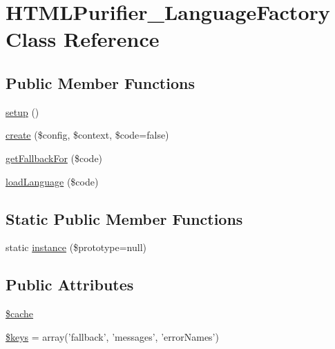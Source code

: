 \hypertarget{classHTMLPurifier__LanguageFactory}{\section{H\+T\+M\+L\+Purifier\+\_\+\+Language\+Factory Class Reference}
\label{classHTMLPurifier__LanguageFactory}
}
\subsection*{Public Member Functions}
\begin{DoxyCompactItemize}
\item 
\hyperlink{classHTMLPurifier__LanguageFactory_a122c2c2803747d67972545567ff7a5c3}{setup} ()
\item 
\hyperlink{classHTMLPurifier__LanguageFactory_a7b729c88631b8dc0b264bf19111a4f32}{create} (\$config, \$context, \$code=false)
\item 
\hyperlink{classHTMLPurifier__LanguageFactory_ae82c6d27d6c5771c2635cb696140b64e}{get\+Fallback\+For} (\$code)
\item 
\hyperlink{classHTMLPurifier__LanguageFactory_a81bdb6578f72d015889ff858d6694c7c}{load\+Language} (\$code)
\end{DoxyCompactItemize}
\subsection*{Static Public Member Functions}
\begin{DoxyCompactItemize}
\item 
static \hyperlink{classHTMLPurifier__LanguageFactory_a488c442bf17292dc832bff6a343667ac}{instance} (\$prototype=null)
\end{DoxyCompactItemize}
\subsection*{Public Attributes}
\begin{DoxyCompactItemize}
\item 
\hyperlink{classHTMLPurifier__LanguageFactory_a963533a7141c8acb5ae890c39c72a85f}{\$cache}
\item 
\hyperlink{classHTMLPurifier__LanguageFactory_ad42771f148ac00e139798d3eac59d592}{\$keys} = array('fallback', 'messages', 'error\+Names')
\end{DoxyCompactItemize}
